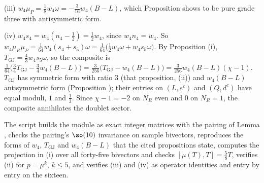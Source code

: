 (iii) $w_{4}\mu_{P} = \tfrac18 w_{4}\omega = -\tfrac{3}{16}w_{4}(B - L)$, which Proposition  shows to be pure grade three with antisymmetric form.

(iv) $w_{4}s_{4} = w_{4}(n_{4} - \tfrac12) = \tfrac12 w_{4}$, since $w_{4}n_{4} = w_{4}$. So $w_{4}\mu_{R}\mu_{P} = \tfrac{1}{64}w_{4}(s_{4} + s_{5})\omega = \tfrac{1}{64}\bigl(\tfrac12 w_{4}\omega + w_{4}s_{5}\omega\bigr)$. By Proposition (i), $T_{\mathrm{GJ}} = \tfrac43 w_{4}s_{5}\omega$, so the composite is $\tfrac{1}{64}\bigl(\tfrac34 T_{\mathrm{GJ}} - \tfrac34 w_{4}(B - L)\bigr) = \tfrac{3}{256}\bigl(T_{\mathrm{GJ}} - w_{4}(B - L)\bigr) = \tfrac{3}{256}w_{4}(B - L)(\chi - 1)$. $T_{\mathrm{GJ}}$ has symmetric form with ratio $3$ (that proposition, (ii)) and $w_{4}(B - L)$ antisymmetric form (Proposition ); their entries on $(L, e^{c})$ and $(Q, d^{c})$ have equal moduli, $1$ and $\tfrac13$. Since $\chi - 1 = -2$ on $N_{R}$ even and $0$ on $N_{R} = 1$, the composite annihilates the doublet sector.

The script builds the module as exact integer matrices with the pairing of Lemma , checks the pairing's $\so(10)$ invariance on sample bivectors, reproduces the forms of $w_{4}$, $T_{\mathrm{GJ}}$ and $w_{4}(B - L)$ that the cited propositions state, computes the projection in (i) over all forty-five bivectors and checks $[\mu(T), T] = \tfrac58 T$, verifies (ii) for $p = \mu^{k}$, $k \le 5$, and verifies (iii) and (iv) as operator identities and entry by entry on the sixteen.
